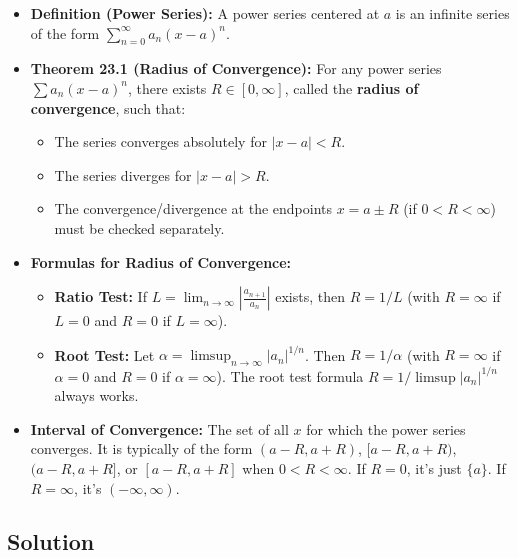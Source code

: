 \documentclass{article}
\begin{document}
\begin{itemize}
    \item \textbf{Definition (Power Series):} A power series centered at \(a\) is an infinite series of the form \(\sum_{n=0}^\infty a_n (x-a)^n\).
    \item \textbf{Theorem 23.1 (Radius of Convergence):} For any power series \(\sum a_n (x-a)^n\), there exists \(R \in [0, \infty]\), called the \textbf{radius of convergence}, such that:
        \begin{itemize}
            \item The series converges absolutely for \(|x-a| < R\).
            \item The series diverges for \(|x-a| > R\).
            \item The convergence/divergence at the endpoints \(x = a \pm R\) (if \(0 < R < \infty\)) must be checked separately.
        \end{itemize}
    \item \textbf{Formulas for Radius of Convergence:}
        \begin{itemize}
            \item \textbf{Ratio Test:} If \(L = \lim_{n\to\infty} \left| \frac{a_{n+1}}{a_n} \right|\) exists, then \(R = 1/L\) (with \(R=\infty\) if \(L=0\) and \(R=0\) if \(L=\infty\)).
            \item \textbf{Root Test:} Let \(\alpha = \limsup_{n\to\infty} |a_n|^{1/n}\). Then \(R = 1/\alpha\) (with \(R=\infty\) if \(\alpha=0\) and \(R=0\) if \(\alpha=\infty\)). The root test formula \(R = 1/\limsup |a_n|^{1/n}\) always works.
        \end{itemize}
    \item \textbf{Interval of Convergence:} The set of all \(x\) for which the power series converges. It is typically of the form \((a-R, a+R)\), \([a-R, a+R)\), \((a-R, a+R]\), or \([a-R, a+R]\) when \(0 < R < \infty\). If \(R=0\), it's just \(\{a\}\). If \(R=\infty\), it's \((-\infty, \infty)\).
\end{itemize}

\subsection*{Solution}
\end{document}
